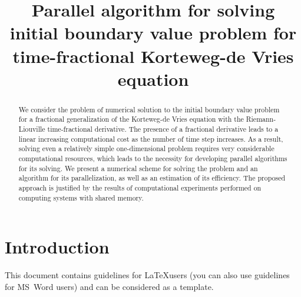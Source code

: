 \documentclass[11pt, oneside, a4paper]{article}
\begin{document}

\title{Parallel algorithm for solving initial boundary value problem for time-fractional Korteweg-de Vries equation}


\begin{abstract}
We consider the problem of numerical solution to the initial boundary value problem for a fractional generalization of the Korteweg-de Vries equation with the Riemann-Liouville time-fractional derivative. The presence of a fractional derivative leads to a linear increasing computational cost as the number of time step increases. As a result, solving even a relatively simple one-dimensional problem requires very considerable computational resources, which leads to the necessity for developing parallel algorithms for its solving. We present a numerical scheme for solving the problem and an algorithm for its parallelization, as well as an estimation of its efficiency. The proposed approach is justified by the results of computational experiments performed on computing systems with shared memory.
\end{abstract}



\section{Introduction}
This document contains guidelines for \LaTeX users 
(you can also use guidelines for MS~Word users) and can be considered as a template. 
\end{document}
